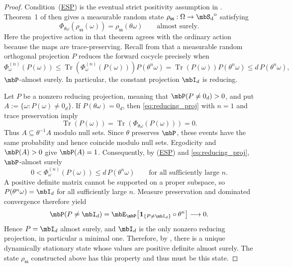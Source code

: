 \documentclass[a4paper]{article}
\numberwithin{equation}{section}   %
\theoremstyle{plain}   %
\theoremstyle{plain}   %
\theoremstyle{examplestyle}
\DeclareMathOperator{\states}{\mbS_d}   %
\DeclareMathOperator{\pr}{\mbP}           %
\newcommand{\s}{\rho_{\mathsf{ss}}}     %
\newcommand{\esp}{{\hyperlink{esp}{ESP}}}
\renewcommand{\tr}[1]{\operatorname{Tr}\left(#1\right)} %
\begin{document}
    \begin{proof}
        Condition~(\esp) is the eventual strict positivity assumption in \cite{MS22}. 
        Theorem~1 of \cite{MS22} then gives a measurable random state \(\s:\Omega\to\states^{\mathrm o}\) satisfying
        \[
            \Phi_{\theta\omega}\left(\s(\omega)\right)
            =\s(\theta\omega)
            \qquad\text{almost surely}.
        \]
        Here the projective action in that theorem agrees with the ordinary
        action because the maps are trace-preserving. 
        Recall from \cite[Definition~1 and Remark~2]{ES24} that a measurable random orthogonal projection \(P\) reduces the forward cocycle precisely when    
        \begin{equation}
        \label{eq:reducing_proj}
            \Phi_\omega^{(n)}\left(P(\omega)\right)
            \le
            \tr{\Phi_\omega^{(n)}(P(\omega))}
                P(\theta^n\omega)
            =
            \tr{P(\omega)}P(\theta^n\omega)
            \le
            d\,P(\theta^n\omega),
        \end{equation}
        $\mbP$-almost surely.
        In particular, the constant projection \(\mbI_d\) is reducing.

        Let \(P\) be a nonzero reducing projection, meaning that \(\pr(P\ne0_d)>0\), and put \(A:=\{\omega:P(\omega)\ne0_d\}\).
        If \(P(\theta\omega)=0_d\), then \eqref{eq:reducing_proj} with \(n=1\)
        and trace preservation imply
        \[
            \tr{P(\omega)}
            =
            \tr{\Phi_{\theta\omega}(P(\omega))}
            =
            0.
        \]
        Thus \(A\subseteq\theta^{-1}A\) modulo null sets.
        Since \(\theta\) preserves \(\pr\), these events have the same probability and hence coincide modulo null sets. 
        Ergodicity and \(\pr(A)>0\) give \(\pr(A)=1\).
        Consequently, by (\esp) and \eqref{eq:reducing_proj}, $\mbP$-almost surely
        \[
            0<\Phi_\omega^{(n)}\left(P(\omega)\right)
            \le d\,P(\theta^n\omega)
            \qquad\text{for all sufficiently large }n.
        \]
        A positive definite matrix cannot be supported on a proper subspace, so \(P(\theta^n\omega)=\mbI_d\) for all sufficiently large \(n\).
        Measure preservation and dominated convergence therefore yield
        \[
            \pr(P\ne\mbI_d)
            =
            \mbE_{\pr}\!\left[
                \mathbf1_{\{P\ne\mbI_d\}}\circ\theta^n
            \right]
            \longrightarrow0.
        \]
        Hence \(P=\mbI_d\) almost surely, and \(\mbI_d\) is the only nonzero
        reducing projection, in particular a minimal one.
        Therefore, by \cite[Theorem~1]{ES24}, there is a unique dynamically stationary state whose values are positive definite almost surely.
        The state \(\s\) constructed above has this property and thus must be this state. 
    \end{proof}
\end{document}
